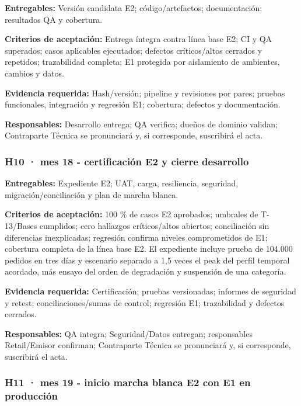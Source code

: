 \documentclass[11pt]{article}
\begin{document}
\textbf{Entregables:} Versión candidata E2; código/artefactos; documentación; resultados QA y cobertura.

\textbf{Criterios de aceptación:} Entrega íntegra contra línea base E2; CI y QA superados; casos aplicables ejecutados; defectos críticos/altos cerrados y repetidos; trazabilidad completa; E1 protegida por aislamiento de ambientes, cambios y datos.

\textbf{Evidencia requerida:} Hash/versión; pipeline y revisiones por pares; pruebas funcionales, integración y regresión E1; cobertura; defectos y documentación.

\textbf{Responsables:} Desarrollo entrega; QA verifica; dueños de dominio validan; Contraparte Técnica se pronunciará y, si corresponde, suscribirá el acta.

\subsubsection{\texorpdfstring{\textbf{H10 · mes 18} - certificación E2 y cierre desarrollo}{H10 · mes 18 - certificación E2 y cierre desarrollo}}\label{t17-h10-mes-18-certificaciuxf3n-e2-y-cierre-desarrollo}

\textbf{Entregables:} Expediente E2; UAT, carga, resiliencia, seguridad, migración/conciliación y plan de marcha blanca.

\textbf{Criterios de aceptación:} 100 \% de casos E2 aprobados; umbrales de T-13/Bases cumplidos; cero hallazgos críticos/altos abiertos; conciliación sin diferencias inexplicadas; regresión confirma niveles comprometidos de E1; cobertura completa de la línea base E2. El expediente incluye prueba de 104.000 pedidos en tres días y escenario separado a 1,5 veces el peak del perfil temporal acordado, más ensayo del orden de degradación y suspensión de una categoría.

\textbf{Evidencia requerida:} Certificación; pruebas versionadas; informes de seguridad y retest; conciliaciones/sumas de control; regresión E1; trazabilidad y defectos cerrados.

\textbf{Responsables:} QA integra; Seguridad/Datos entregan; responsables Retail/Emisor confirman; Contraparte Técnica se pronunciará y, si corresponde, suscribirá el acta.

\subsubsection{\texorpdfstring{\textbf{H11 · mes 19} - inicio marcha blanca E2 con E1 en producción}{H11 · mes 19 - inicio marcha blanca E2 con E1 en producción}}\label{t17-h11-mes-19-inicio-marcha-blanca-e2-con-e1-en-producciuxf3n}
\end{document}
